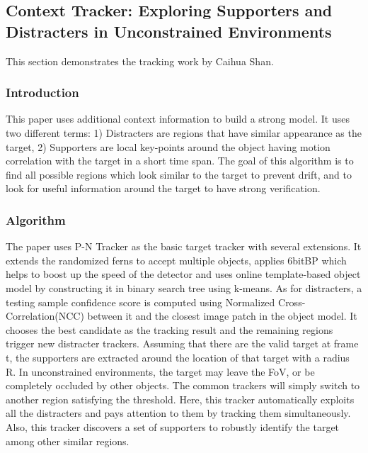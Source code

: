 \documentclass{acm_proc_article-sp}
\begin{document}
\subsection{Context Tracker: Exploring Supporters and Distracters in Unconstrained Environments}
This section demonstrates the tracking work by Caihua Shan.

\subsubsection{Introduction}
    This paper uses additional context information to build a strong model. It uses two different terms: 1) Distracters are regions that have similar appearance as the target, 2) Supporters are local key-points around the object having motion correlation with the target in a short time span. The goal of this algorithm is to find all possible regions which look similar to the target to prevent drift, and to look for useful information around the target to have strong verification.
    
\subsubsection{Algorithm}
    The paper uses P-N Tracker as the basic target tracker with several extensions. It extends the randomized ferns to accept multiple objects, applies 6bitBP which helps to boost up the speed of the detector and uses online template-based object model by constructing it in binary search tree using k-means.
    \newline
    As for distracters, a testing sample confidence score is computed using Normalized Cross-Correlation(NCC) between it and the closest image patch in the object model. It chooses the best candidate as the tracking result and the remaining regions trigger new distracter trackers.
    \newline
    Assuming that there are the valid target at frame t, the supporters are extracted around the location of that target with a radius R.
    \newline
    In unconstrained environments, the target may leave the FoV, or be completely occluded by other objects. The common trackers will simply switch to another region satisfying the threshold. Here, this tracker automatically exploits all the distracters and pays attention to them by tracking them simultaneously. Also, this tracker discovers a set of supporters to robustly identify the target among other similar regions.
\end{document}
